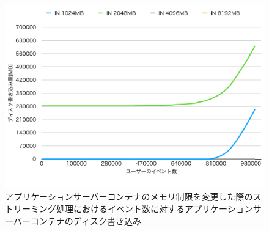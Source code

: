 \documentclass[../../../../../main]{subfiles}
\begin{document}
    \begin{figure}[H]
        \centering
        \includegraphics[width=12cm]{graph}
        \caption{アプリケーションサーバーコンテナのメモリ制限を変更した際のストリーミング処理におけるイベント数に対するアプリケーションサーバーコンテナのディスク書き込み}
        \label{fig:stream-change-app-memory-limit-app-disk-in-app_4_db_1_1024}
    \end{figure}
\end{document}
